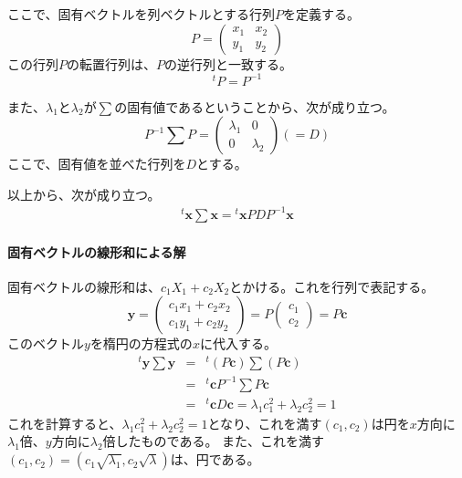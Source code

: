ここで、固有ベクトルを列ベクトルとする行列$P$を定義する。
\begin{equation*}
 P = \begin{pmatrix}
      x_1 & x_2\\
      y_1 & y_2
     \end{pmatrix}
\end{equation*}
この行列$P$の転置行列は、$P$の逆行列と一致する。
\begin{equation*}
 {}^t\!P = P^{-1}
\end{equation*}

また、$\lambda_1$と$\lambda_2$が$\sum$の固有値であるということから、次が成り立つ。
\begin{equation*}
 P^{-1}\sum P = \begin{pmatrix}
                 \lambda_1 & 0\\
                 0 & \lambda_2
                \end{pmatrix}(=D)
\end{equation*}
ここで、固有値を並べた行列を$D$とする。

以上から、次が成り立つ。
\begin{eqnarray*}
 {}^t\!\bm{x}\sum\bm{x} = {}^t\!\bm{x}PDP^{-1}\bm{x}
\end{eqnarray*}

\paragraph{固有ベクトルの線形和による解}
固有ベクトルの線形和は、$c_1X_1+c_2X_2$とかける。これを行列で表記する。
\begin{equation*}
 \bm{y} = \begin{pmatrix}
      c_1 x_1+ c_2 x_2\\
      c_1y_1+c_2y_2
     \end{pmatrix}
     = P\begin{pmatrix}
         c_1\\
         c_2
        \end{pmatrix}=P\bm{c}
\end{equation*}
このベクトル$y$を楕円の方程式の$x$に代入する。
\begin{eqnarray*}
 {}^t\!\bm{y} \sum \bm{y} &=& {}^t\!(P\bm{c})\sum(P\bm{c}) \\
 &=& {}^t\!\bm{c}P^{-1} \sum P \bm{c} \\
 &=& {}^t\!\bm{c} D \bm{c} = \lambda_1c_1^2+\lambda_2c_2^2 = 1
\end{eqnarray*}
これを計算すると、$\lambda_1c_1^2+\lambda_2c_2^2=1$となり、これを満す$(c_1,c_2)$は円を$x$方向に$\lambda_1$倍、$y$方向に$\lambda_2$倍したものである。
また、これを満す$(c_1,c_2)=(c_1\sqrt{\lambda_1},c_2\sqrt{\lambda})$は、円である。

